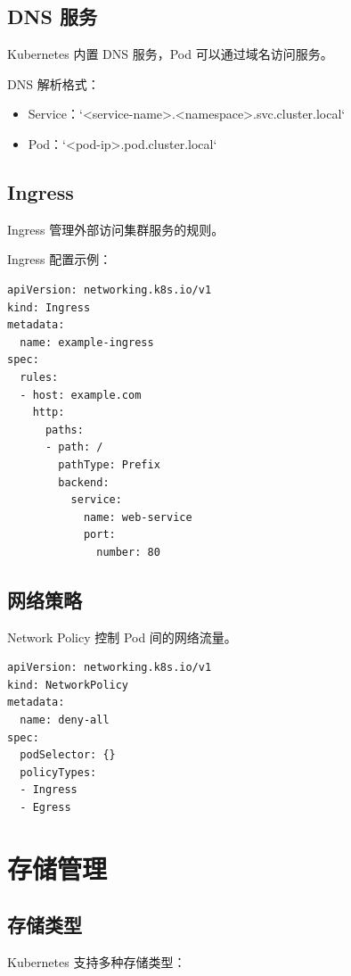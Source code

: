 \documentclass[12pt,UTF8]{ctexbook}
\begin{document}
\section{DNS 服务}
\label{sec:dns_service}

Kubernetes 内置 DNS 服务，Pod 可以通过域名访问服务。

DNS 解析格式：
\begin{itemize}
    \item Service：`<service-name>.<namespace>.svc.cluster.local`
    \item Pod：`<pod-ip>.pod.cluster.local`
\end{itemize}

\section{Ingress}
\label{sec:ingress}

Ingress 管理外部访问集群服务的规则。

Ingress 配置示例：
\begin{lstlisting}
apiVersion: networking.k8s.io/v1
kind: Ingress
metadata:
  name: example-ingress
spec:
  rules:
  - host: example.com
    http:
      paths:
      - path: /
        pathType: Prefix
        backend:
          service:
            name: web-service
            port:
              number: 80
\end{lstlisting}

\section{网络策略}
\label{sec:network_policy}

Network Policy 控制 Pod 间的网络流量。

\begin{lstlisting}
apiVersion: networking.k8s.io/v1
kind: NetworkPolicy
metadata:
  name: deny-all
spec:
  podSelector: {}
  policyTypes:
  - Ingress
  - Egress
\end{lstlisting}

\chapter{存储管理}
\label{chap:storage}

\section{存储类型}
\label{sec:storage_types}

Kubernetes 支持多种存储类型：
\end{document}
